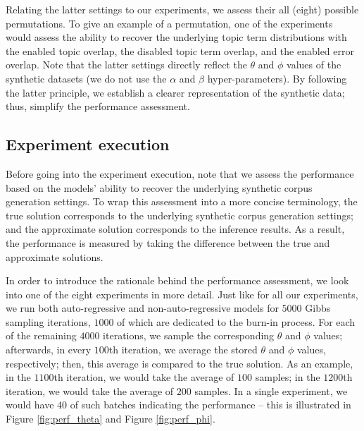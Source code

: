 \documentclass{mpaper}
\begin{document}
\par Relating the latter settings to our experiments, we assess their all (eight) possible permutations. To give an example of a permutation, one of the experiments would assess the ability to recover the underlying topic term distributions with the enabled topic overlap, the disabled topic term overlap, and the enabled error overlap. Note that the latter settings directly reflect the $\theta$ and $\phi$ values of the synthetic datasets (we do not use the $\alpha$ and $\beta$ hyper-parameters). By following the latter principle, we establish a clearer representation of the synthetic data; thus, simplify the performance assessment.

\subsection{Experiment execution}


\par Before going into the experiment execution, note that we assess the performance based on the models' ability to recover the underlying synthetic corpus generation settings. To wrap this assessment into a more concise terminology, the true solution corresponds to the underlying synthetic corpus generation settings; and the approximate solution corresponds to the inference results. As a result, the performance is measured by taking the difference between the true and approximate solutions. 

\par In order to introduce the rationale behind the performance assessment, we look into one of the eight experiments in more detail. Just like for all our experiments, we run both auto-regressive and non-auto-regressive models for $5000$ Gibbs sampling iterations, $1000$ of which are dedicated to the burn-in process. For each of the remaining $4000$ iterations, we sample the corresponding $\theta$ and $\phi$ values; afterwards, in every $100$th iteration, we average the stored $\theta$ and $\phi$ values, respectively; then, this average is compared to the true solution. As an example, in the $1100$th iteration, we would take the average of $100$ samples; in the $1200$th iteration, we would take the average of $200$ samples. In a single experiment, we would have $40$ of such batches indicating the performance -- this is illustrated in Figure \ref{fig:perf_theta} and Figure \ref{fig:perf_phi}.
\end{document}
